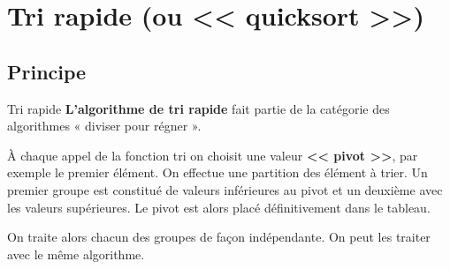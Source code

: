 \section{Tri rapide (ou << quicksort >>)}

\subsection{Principe}

\begin{defi}{Tri rapide}
\textbf{L'algorithme de tri rapide} fait partie de la catégorie des algorithmes « diviser pour régner ».

À chaque appel de la fonction tri on choisit une valeur \textbf{<< pivot >>}, par exemple le premier élément. On effectue une partition des élément à trier. Un premier groupe est constitué de valeurs inférieures au pivot  et un deuxième avec les valeurs supérieures.
Le pivot est alors placé définitivement dans le tableau.

On traite alors chacun des groupes de façon indépendante. On peut les traiter avec le même algorithme.
\end{defi}

